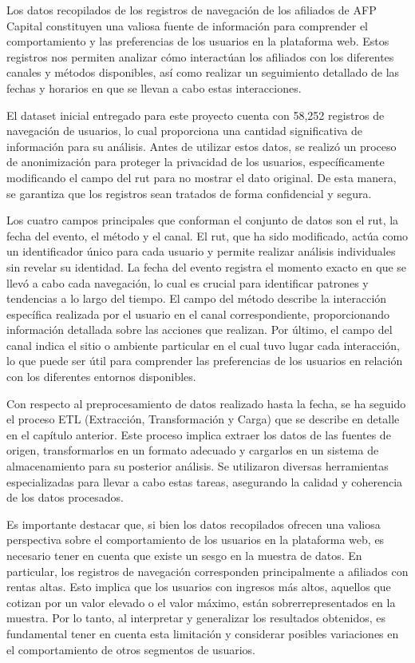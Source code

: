 Los datos recopilados de los registros de navegación de los afiliados de AFP Capital constituyen una valiosa fuente de información para comprender el comportamiento y las preferencias de los usuarios en la plataforma web. Estos registros nos permiten analizar cómo interactúan los afiliados con los diferentes canales y métodos disponibles, así como realizar un seguimiento detallado de las fechas y horarios en que se llevan a cabo estas interacciones.

El dataset inicial entregado para este proyecto cuenta con 58,252 registros de navegación de usuarios, lo cual proporciona una cantidad significativa de información para su análisis. Antes de utilizar estos datos, se realizó un proceso de anonimización para proteger la privacidad de los usuarios, específicamente modificando el campo del rut para no mostrar el dato original. De esta manera, se garantiza que los registros sean tratados de forma confidencial y segura.

Los cuatro campos principales que conforman el conjunto de datos son el rut, la fecha del evento, el método y el canal. El rut, que ha sido modificado, actúa como un identificador único para cada usuario y permite realizar análisis individuales sin revelar su identidad. La fecha del evento registra el momento exacto en que se llevó a cabo cada navegación, lo cual es crucial para identificar patrones y tendencias a lo largo del tiempo. El campo del método describe la interacción específica realizada por el usuario en el canal correspondiente, proporcionando información detallada sobre las acciones que realizan. Por último, el campo del canal indica el sitio o ambiente particular en el cual tuvo lugar cada interacción, lo que puede ser útil para comprender las preferencias de los usuarios en relación con los diferentes entornos disponibles.

Con respecto al preprocesamiento de datos realizado hasta la fecha, se ha seguido el proceso ETL (Extracción, Transformación y Carga) que se describe en detalle en el capítulo anterior. Este proceso implica extraer los datos de las fuentes de origen, transformarlos en un formato adecuado y cargarlos en un sistema de almacenamiento para su posterior análisis. Se utilizaron diversas herramientas especializadas para llevar a cabo estas tareas, asegurando la calidad y coherencia de los datos procesados.

Es importante destacar que, si bien los datos recopilados ofrecen una valiosa perspectiva sobre el comportamiento de los usuarios en la plataforma web, es necesario tener en cuenta que existe un sesgo en la muestra de datos. En particular, los registros de navegación corresponden principalmente a afiliados con rentas altas. Esto implica que los usuarios con ingresos más altos, aquellos que cotizan por un valor elevado o el valor máximo, están sobrerrepresentados en la muestra. Por lo tanto, al interpretar y generalizar los resultados obtenidos, es fundamental tener en cuenta esta limitación y considerar posibles variaciones en el comportamiento de otros segmentos de usuarios.